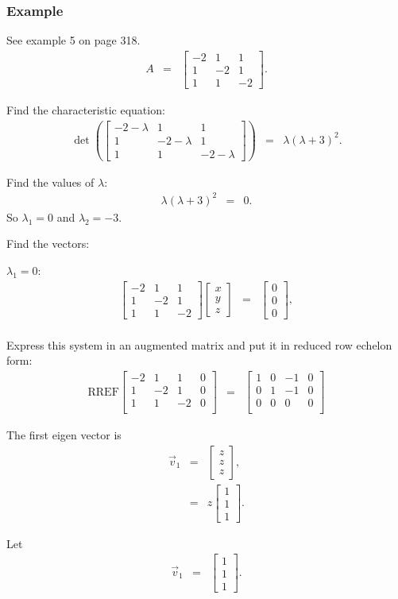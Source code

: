 \documentclass{beamer}
\newcommand{\lp}{\left(}
\newcommand{\rp}{\right)}
\newcommand{\vecThree}[3]{
  \left[
  \begin{array}{r}
    #1 \\  #2 \\ #3
  \end{array}
  \right]
}
\newcommand{\arrayThree}[9]{
  \left[
    \begin{array}{rrr}
      #1 & #2 & #3 \\
      #4 & #5 & #6 \\
      #7 & #8 & #9
    \end{array}
  \right]
}
\newcommand{\startRowFour}{
  \left[
    \begin{array}{rrr|r}
}
\newcommand{\oneRowFour}[4] {
      #1 & #2 & #3 & #4 \\
}
\newcommand{\stopRowOps}{
    \end{array}
  \right]
}
\begin{document}
\begin{frame}
  \frametitle{Example}

  See example 5 on page 318.
  \begin{eqnarray*}
    A & = & \arrayThree{-2}{1}{1}{1}{-2}{1}{1}{1}{-2}.
  \end{eqnarray*}

  Find the characteristic equation:
  \begin{eqnarray*}
    \det\lp\arrayThree{-2-\lambda}{1}{1}{1}{-2-\lambda}{1}{1}{1}{-2-\lambda}\rp
    & = & \lambda (\lambda+3)^2.
  \end{eqnarray*}

  Find the values of $\lambda$:
  \begin{eqnarray*}
    \lambda (\lambda+3)^2 & = & 0.
  \end{eqnarray*}
  So $\lambda_1 = 0$ and $\lambda_2=-3$.


\end{frame}


\begin{frame}
  Find the vectors:

  $\lambda_1 = 0$:
  \begin{eqnarray*}
    \arrayThree{-2}{1}{1}{1}{-2}{1}{1}{1}{-2}\vecThree{x}{y}{z} & = & \vecThree{0}{0}{0}, \\
  \end{eqnarray*}

  Express this system in an augmented matrix and put it in reduced row
  echelon form:
  \begin{eqnarray*}
    \mathrm{RREF}\startRowFour
    \oneRowFour{-2}{1}{1}{0} 
    \oneRowFour{1}{-2}{1}{0}
    \oneRowFour{1}{1}{-2}{0}
    \stopRowOps
    & = & 
    \startRowFour
    \oneRowFour{1}{0}{-1}{0} 
    \oneRowFour{0}{1}{-1}{0}
    \oneRowFour{0}{0}{0}{0}
    \stopRowOps
  \end{eqnarray*}


\end{frame}

\begin{frame}
  The first eigen vector is 
  \begin{eqnarray*}
    \vec{v}_1 & = & \vecThree{z}{z}{z}, \\
    & = & z \vecThree{1}{1}{1}.
  \end{eqnarray*}

  Let
  \begin{eqnarray*}
    \vec{v}_1 & = & \vecThree{1}{1}{1}.
  \end{eqnarray*}

\end{frame}
\end{document}
